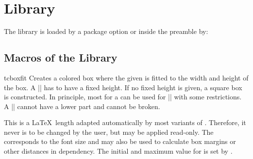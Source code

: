 \clearpage
\section{Library }\label{sec:fitting}%
%
The library is loaded by a package option or inside the preamble by:
\begin{dispListing}
\end{dispListing}

\subsection{Macros of the Library}

\begin{docCommand}{tcboxfit}{}
  Creates a colored box where the given  is fitted to
  the width and height of the box. A |\tcboxfit| has to have a fixed height.
  If no fixed height is given, a square box is constructed.
  In principle, most  for a 
  can be used for |\tcboxfit| with some restrictions. A |\tcboxfit| cannot have
  a lower part and cannot be broken.

\enlargethispage*{1cm}
\begin{dispExample}
\begin{tcbraster}[raster columns=3,raster valign=bottom]
  \tcboxfit[height=8cm]{\lipsum[1]}
  \tcboxfit[height=4cm]{\lipsum[1]}
  \tcboxfit[height=2cm]{\lipsum[1]}
\end{tcbraster}
\begin{tcbraster}[colback=green!10!white,boxsep=1mm]
  \tcboxfit[height=4cm]{\lipsum[2]}
  \tcboxfit[height=4cm,title=With a title]{\lipsum[2]}
\end{tcbraster}
\end{dispExample}
\end{docCommand}


\clearpage


\begin{docCommands}[
    doc name        = tcbfitdim,
    doc description = {read-only \LaTeX\ length},
    doc updated     = 2020-04-24,
  ]{}
  This is a \LaTeX\ length adapted automatically by most variants of
  . Therefore, it never is to be
  changed by the user, but may be applied read-only.
  The  corresponds to the font size and may also
  be used to calculate box margins or other distances in dependency.
  The initial and maximum value for  is set by
  .
\end{docCommands}


